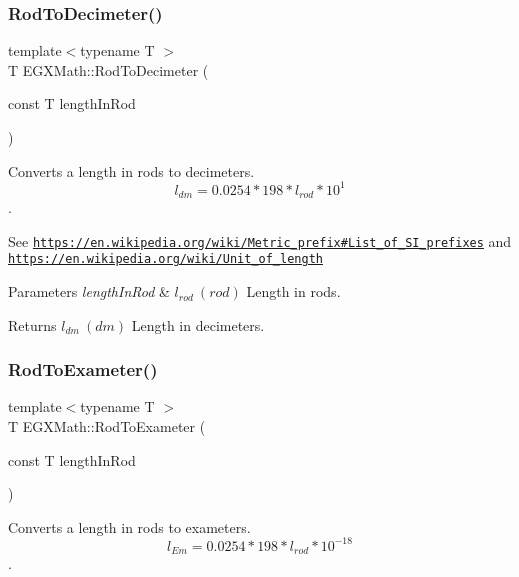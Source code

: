 \subsubsection{\texorpdfstring{Rod\+To\+Decimeter()}{RodToDecimeter()}}
{\footnotesize\ttfamily template$<$typename T $>$ \\
T E\+G\+X\+Math\+::\+Rod\+To\+Decimeter (\begin{DoxyParamCaption}\item[{const T}]{length\+In\+Rod }\end{DoxyParamCaption})}



Converts a length in rods to decimeters. \[ l_{dm}=0.0254 * 198 * l_{rod} * 10^{1} \]. 

See \href{https://en.wikipedia.org/wiki/Metric_prefix#List_of_SI_prefixes}{\tt https\+://en.\+wikipedia.\+org/wiki/\+Metric\+\_\+prefix\#\+List\+\_\+of\+\_\+\+S\+I\+\_\+prefixes} and \href{https://en.wikipedia.org/wiki/Unit_of_length}{\tt https\+://en.\+wikipedia.\+org/wiki/\+Unit\+\_\+of\+\_\+length} 
\begin{DoxyParams}{Parameters}
{\em length\+In\+Rod} & $ l_{rod}\ (rod)$ Length in rods. \\
\hline
\end{DoxyParams}
\begin{DoxyReturn}{Returns}
$ l_{dm}\ (dm)$ Length in decimeters. 
\end{DoxyReturn}
\mbox{\label{group___e_g_x_math-_conversions-_length_conversions-_surveyors-_rod-_s_i_ga2e5ab24819c55373287494675f74f3a9}} 
\subsubsection{\texorpdfstring{Rod\+To\+Exameter()}{RodToExameter()}}
{\footnotesize\ttfamily template$<$typename T $>$ \\
T E\+G\+X\+Math\+::\+Rod\+To\+Exameter (\begin{DoxyParamCaption}\item[{const T}]{length\+In\+Rod }\end{DoxyParamCaption})}



Converts a length in rods to exameters. \[ l_{Em}=0.0254 * 198 * l_{rod} * 10^{-18} \]. 

